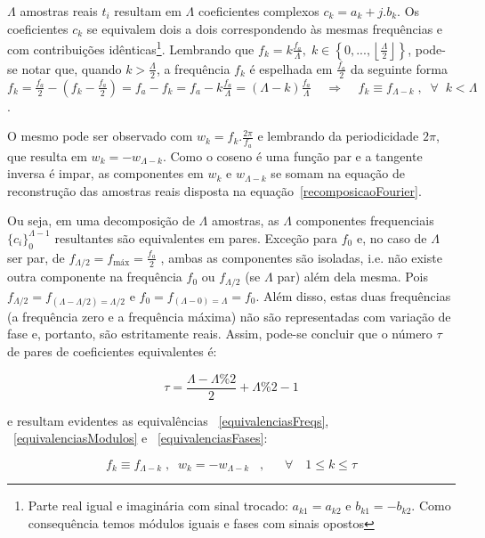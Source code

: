 $\Lambda$ amostras reais $t_i$ resultam em $\Lambda$ coeficientes complexos $c_k=a_k+j.b_k$. Os coeficientes $c_k$ se equivalem dois a dois correspondendo às mesmas frequências e com contribuições idênticas\footnote{Parte real igual e imaginária com sinal trocado: $a_{k1}=a_{k2}$ e $b_{k1}=-b_{k2}$. Como consequência temos módulos iguais e fases com sinais opostos}. Lembrando que $f_k = k\frac{f_a}{\Lambda}, \; k \in \left\{0, ..., \left \lfloor \frac{\Lambda}{2} \right \rfloor \right\} $, pode-se notar que, quando $k> \frac{\Lambda}{2} $,
a frequência $f_k$ é espelhada em $\frac{f_a}{2}$ da seguinte forma $f_k=\frac{f_a}{2} - (f_k-\frac{f_a}{2})=f_a-f_k=f_a - k\frac{f_a}{\Lambda}=(\Lambda-k)\frac{f_a}{\Lambda} \;\;\;\; \Rightarrow \;\;\;\; f_k\equiv f_{\Lambda-k} \; ,\;\; \forall \;\; k<\Lambda$. 

 
 O mesmo pode ser observado com 
 $w_k=f_k.\frac{2\pi}{f_a}$ e lembrando da periodicidade $2\pi$, que resulta em $w_k=-w_{\Lambda-k}$. Como o coseno é uma função par e a tangente inversa é impar, as componentes em $w_k$ e $w_{\Lambda-k}$ se somam na equação de reconstrução das amostras reais disposta na equação~\ref{recomposicaoFourier}.

  Ou seja, em uma decomposição de $\Lambda$ amostras, as $\Lambda$ componentes frequenciais $\{c_i\}_0^{\Lambda-1}$ resultantes
   são equivalentes em pares.
   Exceção para $f_0$ e, no caso de $\Lambda$ ser par, de $f_{\Lambda/2}=f_{\text{máx}}=\frac{f_a}{2}$ , ambas as componentes são isoladas, i.e. não existe outra componente na frequência $f_0$ ou $f_{\Lambda/2}$ (se $\Lambda$ par) além dela mesma. 
Pois $f_{\Lambda/2}=f_{(\Lambda-\Lambda/2) = \Lambda/2}$ e $f_0=f_{(\Lambda-0)=\Lambda}=f_0$.
Além disso, estas duas frequências (a frequência zero e a frequência máxima) não são representadas com variação de fase e, portanto, são estritamente reais. Assim, pode-se
   concluir que o número $\tau$ de pares de coeficientes equivalentes é:

\begin{equation}\label{coefsPareados}
\tau = \frac{\Lambda - \Lambda \% 2}{2} +\Lambda \% 2 -1
\end{equation}

e resultam evidentes as equivalências ~\ref{equivalenciasFreqs}, ~\ref{equivalenciasModulos} e ~\ref{equivalenciasFases}:

\begin{equation}\label{equivalenciasFreqs}
f_{k}\equiv f_{\Lambda-k}\;, \;\; w_{k}=-w_{\Lambda-k}\;\;\;, \quad \;\; \forall \quad 1 \leq k \leq \tau  
\end{equation}

